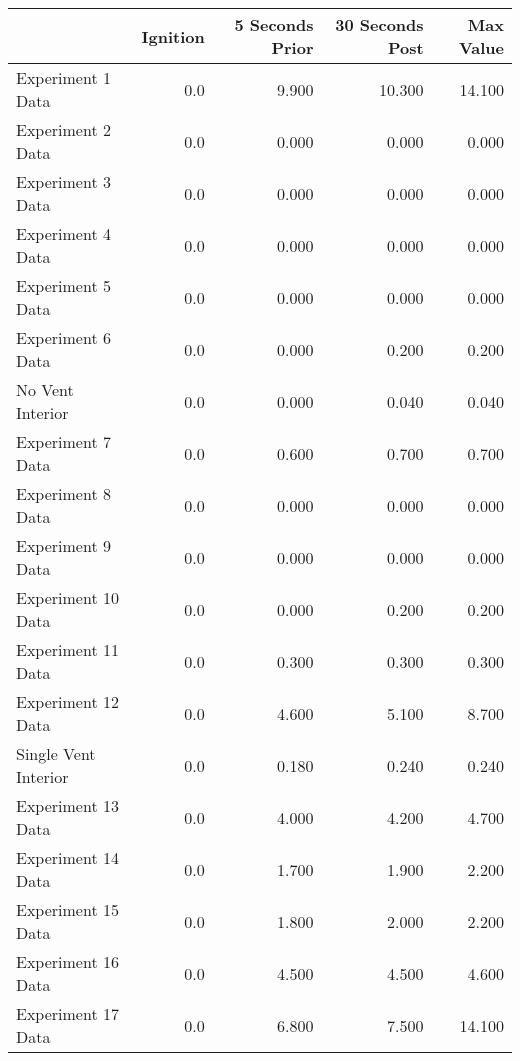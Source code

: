 \begin{tabular}{lrrrr}
\toprule
{} &  Ignition &  5 Seconds Prior &  30 Seconds Post &  Max Value \\
\midrule
Experiment 1 Data    &       0.0 &            9.900 &           10.300 &     14.100 \\
Experiment 2 Data    &       0.0 &            0.000 &            0.000 &      0.000 \\
Experiment 3 Data    &       0.0 &            0.000 &            0.000 &      0.000 \\
Experiment 4 Data    &       0.0 &            0.000 &            0.000 &      0.000 \\
Experiment 5 Data    &       0.0 &            0.000 &            0.000 &      0.000 \\
Experiment 6 Data    &       0.0 &            0.000 &            0.200 &      0.200 \\
No Vent Interior     &       0.0 &            0.000 &            0.040 &      0.040 \\
Experiment 7 Data    &       0.0 &            0.600 &            0.700 &      0.700 \\
Experiment 8 Data    &       0.0 &            0.000 &            0.000 &      0.000 \\
Experiment 9 Data    &       0.0 &            0.000 &            0.000 &      0.000 \\
Experiment 10 Data   &       0.0 &            0.000 &            0.200 &      0.200 \\
Experiment 11 Data   &       0.0 &            0.300 &            0.300 &      0.300 \\
Experiment 12 Data   &       0.0 &            4.600 &            5.100 &      8.700 \\
Single Vent Interior &       0.0 &            0.180 &            0.240 &      0.240 \\
Experiment 13 Data   &       0.0 &            4.000 &            4.200 &      4.700 \\
Experiment 14 Data   &       0.0 &            1.700 &            1.900 &      2.200 \\
Experiment 15 Data   &       0.0 &            1.800 &            2.000 &      2.200 \\
Experiment 16 Data   &       0.0 &            4.500 &            4.500 &      4.600 \\
Experiment 17 Data   &       0.0 &            6.800 &            7.500 &     14.100 \\

\end{tabular}
